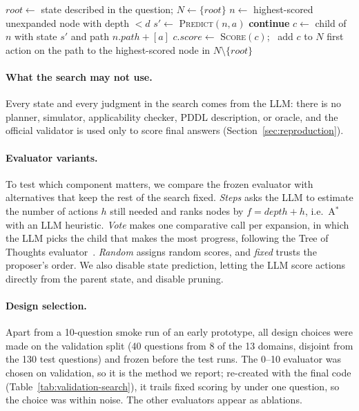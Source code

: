 \begin{algorithm}[t]
\caption{LLM-guided best-first search (frozen: $k{=}3$, $d{=}2$, $B{=}14$ calls)}
\label{alg:search}
\begin{algorithmic}[1]
\State $\mathit{root} \gets$ state described in the question; $N \gets \{\mathit{root}\}$
  \State $n \gets$ highest-scored unexpanded node with depth $< d$
   
    \State $s' \gets$ \textsc{Predict}$(n, a)$ 
     \State \textbf{continue} 
    \EndIf
    \State $c \gets$ child of $n$ with state $s'$ and path $n.\mathit{path} + [a]$
    \State $c.\mathit{score} \gets$ \textsc{Score}$(c)$; \ add $c$ to $N$ 
  \EndFor
\EndWhile
\State \Return first action on the path to the highest-scored node in $N \setminus \{\mathit{root}\}$
\end{algorithmic}
\end{algorithm}

\paragraph{What the search may not use.}
Every state and every judgment in the search comes from the LLM: there is no planner, simulator,
applicability checker, PDDL description, or oracle, and the official validator is used only to score final answers (Section~\ref{sec:reproduction}).

\paragraph{Evaluator variants.}
To test which component matters, we compare the frozen evaluator with alternatives that keep the
rest of the search fixed. \emph{Steps} asks the LLM to estimate the number of actions $h$ still
needed and ranks nodes by $f = \mathit{depth} + h$, i.e.\ A$^*$~\citep{hart1968astar} with an LLM
heuristic. \emph{Vote} makes one comparative call per expansion, in which the LLM picks the child
that makes the most progress, following the Tree of Thoughts evaluator~\citep{yao2023tot}.
\emph{Random} assigns random scores, and \emph{fixed} trusts the proposer's order. We also disable
state prediction, letting the LLM score actions directly from the parent state, and disable
pruning.

\paragraph{Design selection.}
Apart from a 10-question smoke run of an early prototype, all design choices were made on the validation split (40 questions from 8 of the 13 domains, disjoint from the 130 test questions) and frozen before the test runs. The 0--10 evaluator was chosen on validation, so it is the method we report; re-created with the final code (Table~\ref{tab:validation-search}), it trails fixed scoring by under one question, so the choice was within noise. The other evaluators appear as ablations.
